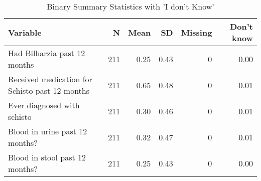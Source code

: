 \begin{table}[!t]
\caption*{
{\large Binary Summary Statistics with 'I don't Know'}
} 
\fontsize{12.0pt}{14.4pt}\selectfont
\begin{tabular*}{\linewidth}{@{\extracolsep{\fill}}lrrrrr}
\toprule
Variable & N & Mean & SD & Missing & Don't know \\ 
\midrule\addlinespace[2.5pt]
Had Bilharzia past 12 months & 211 & 0.25 & 0.43 & 0 & 0.00 \\ 
Received medication for Schisto past 12 months & 211 & 0.65 & 0.48 & 0 & 0.01 \\ 
Ever diagnosed with schisto & 211 & 0.30 & 0.46 & 0 & 0.01 \\ 
Blood in urine past 12 months? & 211 & 0.32 & 0.47 & 0 & 0.01 \\ 
Blood in stool past 12 months? & 211 & 0.25 & 0.43 & 0 & 0.00 \\ 
\bottomrule
\end{tabular*}
\end{table}

